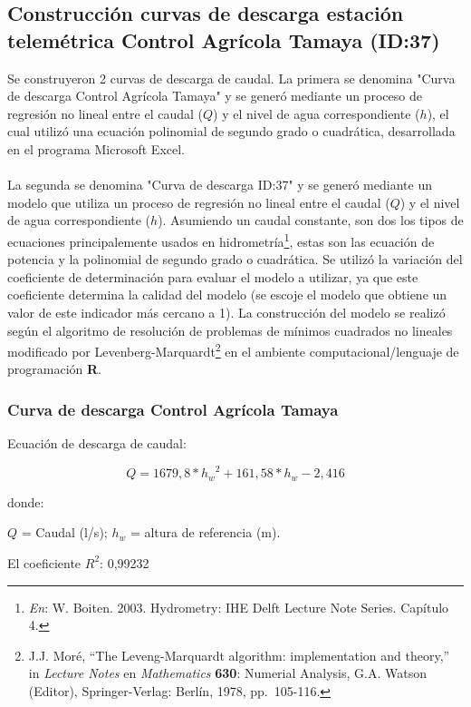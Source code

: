 \documentclass[]{article}
\let\rmarkdownfootnote\footnote%
\def\footnote{\protect\rmarkdownfootnote}
\begin{document}
\subsection{Construcción curvas de descarga estación telemétrica Control Agrícola Tamaya (ID:37)}\label{construcción curva}

Se construyeron 2 curvas de descarga de caudal. La primera se denomina "Curva de descarga Control Agrícola Tamaya" y se generó mediante un proceso de regresión no lineal entre el caudal (\(Q\)) y el nivel de agua correspondiente (\(h\)), el cual utilizó una ecuación polinomial de segundo grado o cuadrática, desarrollada en el programa Microsoft Excel.\\
\\
La segunda se denomina "Curva de descarga ID:37" y se generó mediante un modelo que utiliza un proceso de regresión no lineal entre el caudal (\(Q\)) y el nivel de agua correspondiente (\(h\)). Asumiendo un caudal constante, son dos los tipos de ecuaciones principalemente usados en hidrometría\footnote{\emph{En}:  W. Boiten. 2003. Hydrometry: IHE Delft Lecture Note Series. Capítulo   4.}, estas son las ecuación de potencia y la polinomial de segundo grado o cuadrática. Se utilizó la variación del coeficiente de determinación para evaluar el modelo a utilizar, ya que este coeficiente determina la calidad del modelo (se escoje el modelo que obtiene un valor de este indicador más cercano a 1). La construcción del modelo se realizó según el algoritmo de resolución de problemas de mínimos cuadrados no lineales modificado por Levenberg-Marquardt\footnote{J.J. Moré, ``The Leveng-Marquardt   algorithm: implementation and theory,'' in \emph{Lecture Notes} en   \emph{Mathematics} \textbf{630}: Numerial Analysis, G.A. Watson   (Editor), Springer-Verlag: Berlín, 1978, pp.~105-116.} en el ambiente computacional/lenguaje de programación \textbf{R}.



\subsubsection{Curva de descarga Control Agrícola Tamaya}\label{CD CAT}

Ecuación de descarga de caudal:

\[Q = 1679,8* {{h_w}^2} + 161,58* h_w - 2,416\]

donde:

\(Q\) = Caudal (l/s); \(h_w\) = altura de referencia (m).

El coeficiente \(R^2\): 0,99232
\end{document}
